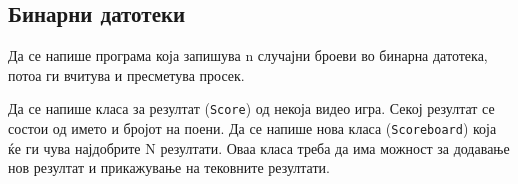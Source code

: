 \begin{questions}


\section{Бинарни датотеки}

\question
Да се напише програма која запишува n случајни броеви во бинарна датотека, потоа
ги вчитува и пресметува просек.



\question
Да се напише класа за резултат (\texttt{Score}) од некоја видео игра. Секој
резултат се состои од името и бројот на поени. Да се напише нова класа
(\texttt{Scoreboard}) која ќе ги чува најдобрите N резултати. Оваа класа треба да има
можност за додавање нов резултат и прикажување на тековните резултати.

\end{questions}


